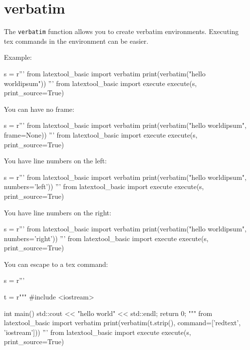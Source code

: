 \section{verbatim}

The \verb!verbatim! function allows you to 
create verbatim environments.
Executing tex commands in the environment can be easier.





Example:
\begin{python}
s = r'''
from latextool_basic import verbatim
print(verbatim("hello world\nlorem ipsum"))
'''
from latextool_basic import execute
execute(s, print_source=True)
\end{python}


You can have no frame:
\begin{python}
s = r'''
from latextool_basic import verbatim
print(verbatim("hello world\nlorem ipsum", frame=None))
'''
from latextool_basic import execute
execute(s, print_source=True)
\end{python}




You have line numbers on the left:
\begin{python}
s = r'''
from latextool_basic import verbatim
print(verbatim("hello world\nlorem ipsum", numbers='left'))
'''
from latextool_basic import execute
execute(s, print_source=True)
\end{python}




You have line numbers on the right:
\begin{python}
s = r'''
from latextool_basic import verbatim
print(verbatim("hello world\nlorem ipsum", numbers='right'))
'''
from latextool_basic import execute
execute(s, print_source=True)
\end{python}




\begin{samepage}
You can escape to a tex command:
\begin{python}
s = r'''

t = r"""
#include <iostream>

int main()
{
    std::cout << "hello world" << std::endl;
    return 0;
}
"""
from latextool_basic import verbatim
print(verbatim(t.strip(), command=['redtext', 'iostream']))
'''
from latextool_basic import execute
execute(s, print_source=True)
\end{python}
\end{samepage}

